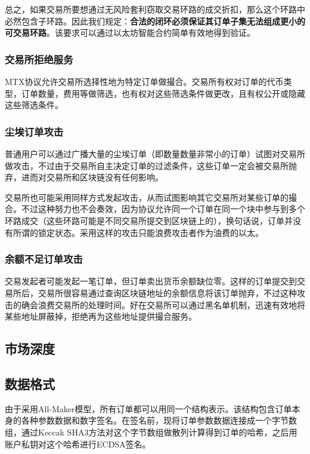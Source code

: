 \documentclass[UTF8,nofonts]{ctexart}
\begin{document}
总之，如果交易所要想通过无风险套利窃取交易环路的成交折扣，那么这个环路中必然包含子环路。因此我们规定：{\bfseries 合法的闭环必须保证其订单子集无法组成更小的可交易环路}。该要求可以通过以太坊智能合约简单有效地得到验证。

\subsubsection{交易所拒绝服务}

MTX协议允许交易所选择性地为特定订单做撮合。交易所有权对订单的代币类型，订单数量，费用等做筛选，也有权对这些筛选条件做更改，且有权公开或隐藏这些筛选条件。

\subsubsection{尘埃订单攻击}
普通用户可以通过广播大量的尘埃订单（即数量数量非常小的订单）试图对交易所做攻击，不过由于交易所自主决定订单的过滤条件，这些订单一定会被交易所抛弃，进而对交易所和区块链没有任何影响。

交易所也可能采用同样方式发起攻击，从而试图影响其它交易所对某些订单的撮合。不过这种努力也不会奏效，因为协议允许同一个订单在同一个块中参与到多个环路成交（这些环路可能是不同交易所提交到区块链上的），换句话说，订单并没有所谓的锁定状态。采用这样的攻击只能浪费攻击者作为油费的以太。

\subsubsection{余额不足订单攻击}

交易发起者可能发起一笔订单，但订单卖出货币余额缺位零。这样的订单提交到交易所后，交易所很容易通过查询区块链地址的余额信息将该订单抛弃，不过这种攻击的确会浪费交易所的处理时间。好在交易所可以通过黑名单机制，迅速有效地将某些地址屏蔽掉，拒绝再为这些地址提供撮合服务。


\subsection{市场深度\label{sec:marketdepth}}

\subsection{数据格式\label{sec:dataformat}}

由于采用All-Maker模型，所有订单都可以用同一个结构表示。该结构包含订单本身的各种参数数据和数字签名。在签名前，现将订单参数数据连接成一个字节数组，通过Keccak SHA3方法对这个字节数组做散列计算得到订单的哈希，之后用账户私钥对这个哈希进行ECDSA签名。
\end{document}
